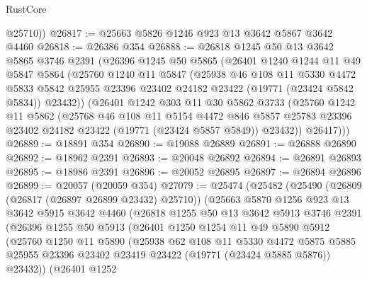 \begin{lexlean}{RustCore}
\begin{coremodule}
        @25710))
@26817 := @25663 @5826 @1246 @923 @13 @3642 @5867 @3642 @4460
@26818 := @26386 @354
@26888 := @26818
    @1245
    @50
    @13
    @3642
    @5865
    @3746
    @2391
    (@26396
      @1245
      @50
      @5865
      (@26401
        @1240
        @1244
        @11
        @49
        @5847
        @5864
        (@25760
          @1240
          @11
          @5847
          (@25938
            @46
            @108
            @11
            @5330
            @4472
            @5833
            @5842
            @25955
            @23396
            @23402
            @24182
            @23422
            (@19771 (@23424 @5842 @5834))
            @23432))
        (@26401
          @1242
          @303
          @11
          @30
          @5862
          @3733
          (@25760
            @1242
            @11
            @5862
            (@25768
              @46
              @108
              @11
              @5154
              @4472
              @846
              @5857
              @25783
              @23396
              @23402
              @24182
              @23422
              (@19771 (@23424 @5857 @5849))
              @23432))
          @26417)))
@26889 := @18891 @354
@26890 := @19088 @26889
@26891 := @26888 @26890
@26892 := @18962 @2391
@26893 := @20048 @26892
@26894 := @26891 @26893
@26895 := @18986 @2391
@26896 := @20052 @26895
@26897 := @26894 @26896
@26899 := @20057 (@20059 @354)
@27079 := @25474
    (@25482
      (@25490
        (@26809 (@26817 (@26897 @26899 @23432) @25710))
        (@25663
          @5870
          @1256
          @923
          @13
          @3642
          @5915
          @3642
          @4460
          (@26818
            @1255
            @50
            @13
            @3642
            @5913
            @3746
            @2391
            (@26396
              @1255
              @50
              @5913
              (@26401
                @1250
                @1254
                @11
                @49
                @5890
                @5912
                (@25760
                  @1250
                  @11
                  @5890
                  (@25938
                    @62
                    @108
                    @11
                    @5330
                    @4472
                    @5875
                    @5885
                    @25955
                    @23396
                    @23402
                    @23419
                    @23422
                    (@19771 (@23424 @5885 @5876))
                    @23432))
                (@26401
                  @1252

\end{coremodule}
\end{lexlean}
